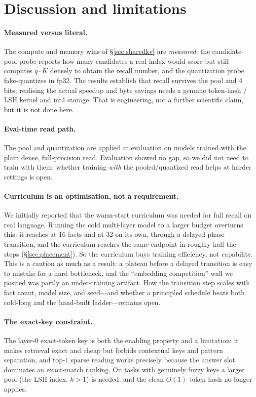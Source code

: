 \section{Discussion and limitations}
\label{sec:discussion}

\paragraph{Measured versus literal.} The compute and memory wins of
\S\ref{sec:sharedkv} are \emph{measured}: the candidate-pool probe reports how many
candidates a real index would score but still computes $q\!\cdot\!K$ densely to
obtain the recall number, and the quantization probe fake-quantizes in fp32. The
results establish that recall survives the pool and 4 bits; realising the actual
speedup and byte savings needs a genuine token-hash / LSH kernel and int4 storage.
That is engineering, not a further scientific claim, but it is not done here.

\paragraph{Eval-time read path.} The pool and quantization are applied at
evaluation on models trained with the plain dense, full-precision read. Evaluation
showed no gap, so we did not need to train with them; whether training \emph{with}
the pooled/quantized read helps at harder settings is open.

\paragraph{Curriculum is an optimisation, not a requirement.} We initially reported
that the warm-start curriculum was needed for full recall on real language. Running
the cold multi-layer model to a larger budget overturns this: it reaches
 at 16 facts and  at 32 on its own, through a delayed
phase transition, and the curriculum reaches the same endpoint in roughly half the
steps (\S\ref{sec:placement}). So the curriculum buys training efficiency, not
capability. This is a caution as much as a result: a plateau before a delayed
transition is easy to mistake for a hard bottleneck, and the ``embedding
competition'' wall we posited was partly an under-training artifact. How the
transition step scales with fact count, model size, and seed---and whether a
principled schedule beats both cold-long and the hand-built ladder---remains open.

\paragraph{The exact-key constraint.} The layer-0 exact-token key is both the
enabling property and a limitation: it makes retrieval exact and cheap but forbids
contextual keys and pattern separation, and top-$1$ sparse reading works precisely
because the answer slot dominates an exact-match ranking. On tasks with genuinely
fuzzy keys a larger pool (the LSH index, $k>1$) is needed, and the clean $O(1)$
token hash no longer applies.

